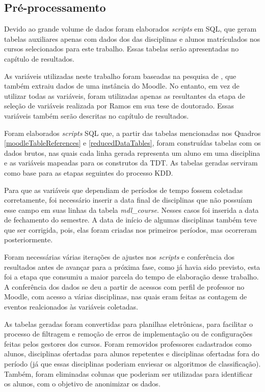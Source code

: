 \subsection{Pré-processamento}

Devido ao grande volume de dados foram elaborados \textit{scripts} em SQL, que
geram tabelas auxiliares apenas com dados dos das disciplinas e alunos
matrículados nos cursos selecionados para este trabalho. Essas tabelas serão
apresentadas no capítulo de resultados.

As variáveis utilizadas neste trabalho foram baseadas na pesquisa de
, que também extraiu dados de uma instância do
Moodle. No entanto, em vez de utilizar todas as variáveis, foram utilizadas
apenas as resultantes da etapa de seleção de variáveis realizada por Ramos em
sua tese de doutorado. Essas variáveis também serão descritas no capítulo de
resultados.

Foram elaborados \textit{scripts} SQL que, a partir das tabelas mencionadas nos
Quadros \ref{moodleTableReferences} e \ref{reducedDataTables}, foram construídas
tabelas com os dados brutos, nas quais cada linha gerada representa um aluno em
uma disciplina e as variáveis mapeadas para os construtos da TDT. As tabelas
geradas serviram como base para as etapas seguintes do processo KDD.

Para que as variáveis que dependiam de períodos de tempo fossem coletadas
corretamente, foi necessário inserir a data final de disciplinas que não
possuíam esse campo em suas linhas da tabela \textit{mdl\_course}. Nesses casos
foi inserida a data de fechamento do semestre. A data de início de algumas
disciplinas também teve que ser corrigida, pois, elas foram criadas nos
primeiros períodos, mas ocorreram posteriormente.

Foram necessárias várias iterações de ajustes nos \textit{scripts} e conferência
dos resultados antes de avançar para a próxima fase, como já havia sido
previsto, esta foi a etapa que consumiu a maior parcela do tempo de elaboração
desse trabalho. A conferência dos dados se deu a partir de acessos com perfil de
professor no Moodle, com acesso a várias disciplinas, nas quais eram feitas as
contagem de eventos realcionados às variáveis coletadas.

As tabelas geradas foram convertidas para planilhas eletrônicas, para facilitar
o processo de filtragem e remoção de erros de implementação ou de configurações
feitas pelos gestores dos cursos. Foram removidos professores cadastrados como
alunos, disciplinas ofertadas para alunos repetentes e disciplinas ofertadas
fora do período (já que essas disciplinas poderiam enviesar os algoritmos de
classificação). Também, foram eliminadas colunas que poderiam ser utilizadas
para identificar os alunos, com o objetivo de anonimizar os dados.

